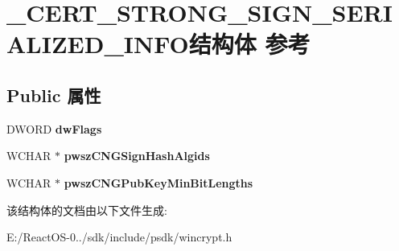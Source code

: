 \hypertarget{struct___c_e_r_t___s_t_r_o_n_g___s_i_g_n___s_e_r_i_a_l_i_z_e_d___i_n_f_o}{}\section{\+\_\+\+C\+E\+R\+T\+\_\+\+S\+T\+R\+O\+N\+G\+\_\+\+S\+I\+G\+N\+\_\+\+S\+E\+R\+I\+A\+L\+I\+Z\+E\+D\+\_\+\+I\+N\+F\+O结构体 参考}
\label{struct___c_e_r_t___s_t_r_o_n_g___s_i_g_n___s_e_r_i_a_l_i_z_e_d___i_n_f_o}
\subsection*{Public 属性}
\begin{DoxyCompactItemize}
\item 
\mbox{\label{struct___c_e_r_t___s_t_r_o_n_g___s_i_g_n___s_e_r_i_a_l_i_z_e_d___i_n_f_o_abfb75e2e9250211aa3ddbfcf4e022acc}} 
D\+W\+O\+RD {\bfseries dw\+Flags}
\item 
\mbox{\label{struct___c_e_r_t___s_t_r_o_n_g___s_i_g_n___s_e_r_i_a_l_i_z_e_d___i_n_f_o_a00e1dfeee11df4f7c4e68b466b078367}} 
W\+C\+H\+AR $\ast$ {\bfseries pwsz\+C\+N\+G\+Sign\+Hash\+Algids}
\item 
\mbox{\label{struct___c_e_r_t___s_t_r_o_n_g___s_i_g_n___s_e_r_i_a_l_i_z_e_d___i_n_f_o_a96369a517cb970d17032c28934e003de}} 
W\+C\+H\+AR $\ast$ {\bfseries pwsz\+C\+N\+G\+Pub\+Key\+Min\+Bit\+Lengths}
\end{DoxyCompactItemize}


该结构体的文档由以下文件生成\+:\begin{DoxyCompactItemize}
\item 
E\+:/\+React\+O\+S-\/0../sdk/include/psdk/wincrypt.\+h\end{DoxyCompactItemize}
